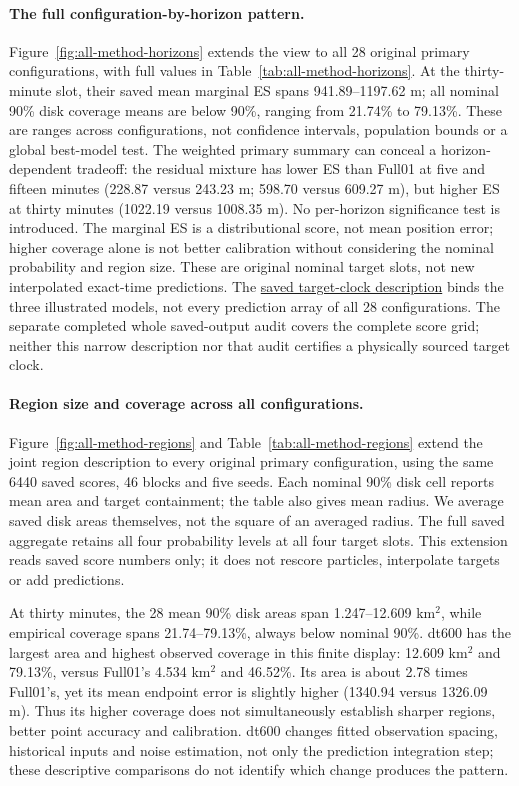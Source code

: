 \paragraph{The full configuration-by-horizon pattern.}
Figure~\ref{fig:all-method-horizons} extends the view to all 28 original
primary configurations, with full values in Table~\ref{tab:all-method-horizons}.
At the thirty-minute slot, their saved mean marginal ES spans 941.89--1197.62 m;
all nominal 90\% disk coverage means are below 90\%, ranging from
21.74\% to 79.13\%. These are ranges across configurations, not confidence
intervals, population bounds or a global best-model test.
The weighted primary summary can conceal a horizon-dependent tradeoff:
the residual mixture has lower ES than Full01 at five and fifteen minutes
(228.87 versus 243.23 m; 598.70 versus 609.27 m), but higher ES at thirty
minutes (1022.19 versus 1008.35 m). No per-horizon significance test is
introduced. The marginal ES is a distributional score, not mean position
error; higher coverage alone is not better calibration without considering
the nominal probability and region size.
These are original nominal target slots, not new interpolated exact-time
predictions. The \hyperref[sec:target-times]{saved target-clock description}
binds the three illustrated models,
not every prediction array of all 28 configurations. The separate completed
whole saved-output audit covers the complete score grid; neither this narrow
description nor that audit certifies a physically sourced target clock.


\FloatBarrier
\paragraph{Region size and coverage across all configurations.}
Figure~\ref{fig:all-method-regions} and Table~\ref{tab:all-method-regions}
extend the joint region description to every original primary configuration,
using the same 6440 saved scores, 46 blocks and five seeds. Each nominal
90\% disk cell reports mean area and target containment; the table also gives
mean radius. We average saved disk areas themselves, not the square of an
averaged radius. The full saved aggregate retains all four probability levels
at all four target slots. This extension reads saved score numbers only;
it does not rescore particles, interpolate targets or add predictions.

At thirty minutes, the 28 mean 90\% disk areas span 1.247--12.609 km\(^{2}\),
while empirical coverage spans 21.74--79.13\%, always below nominal 90\%.
dt600 has the largest area and highest observed coverage in this finite
display: 12.609 km\(^{2}\) and 79.13\%, versus Full01's 4.534 km\(^{2}\)
and 46.52\%. Its area is about 2.78 times Full01's, yet its mean endpoint
error is slightly higher (1340.94 versus 1326.09 m). Thus its higher coverage
does not simultaneously establish sharper regions, better point accuracy
and calibration. dt600 changes fitted observation spacing, historical inputs
and noise estimation, not only the prediction integration step; these
descriptive comparisons do not identify which change produces the pattern.

